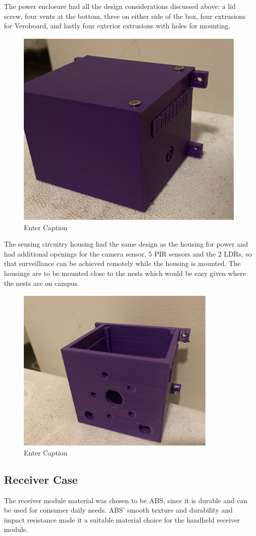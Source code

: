 \documentclass[class=report,11pt,crop=false]{standalone}
\begin{document}
The power enclosure had all the design considerations discussed above: a lid screw, four vents at the bottom, three on either side of the box, four extrusions for Veroboard, and lastly four exterior extrusions with holes for mounting.
\newline
\begin{figure}[H]
    \centering
    \includegraphics[width=0.5\linewidth]{final-report/Images/power_house.png}
    \caption{Enter Caption}
    \label{fig:enter-label}
\end{figure}



 
The sensing circuitry housing had the same design as the housing for power and had additional openings for the camera sensor, 5 PIR sensors and the 2 LDRs, so that surveillance can be achieved remotely while the housing is mounted. The housings are to be mounted close to the nests which would be easy given where the nests are on campus. 

\begin{figure}[H]
    \centering
    \includegraphics[width=0.5\linewidth]{final-report/Images/sensor_house.png}
    \caption{Enter Caption}
    \label{fig:enter-label}
\end{figure}

 
\subsection{Receiver Case}
The receiver module material was chosen to be ABS, since it is durable and can be used for consumer daily needs. ABS’ smooth texture and durability and impact resistance made it a suitable material choice for the handheld receiver module.
\newline
\end{document}
